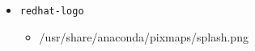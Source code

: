 \begin{itemize}
\item \texttt{redhat-logo}
\begin{itemize}
\item /usr/share/anaconda/pixmaps/splash.png
\end{itemize}
\end{itemize}
